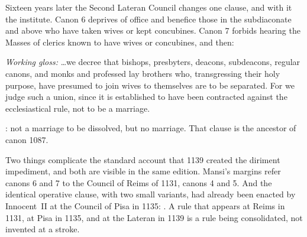 Sixteen years later the Second Lateran Council changes one clause, and with it the institute. Canon 6 deprives of office and benefice those in the subdiaconate and above who have taken wives or kept concubines. Canon 7 forbids hearing the Masses of clerics known to have wives or concubines, and then:

\begin{studyframe}

\emph{Working gloss:} \ldots we decree that bishops, presbyters, deacons, subdeacons, regular canons, and monks and professed lay brothers who, transgressing their holy purpose, have presumed to join wives to themselves are to be separated. For we judge such a union, since it is established to have been contracted against the ecclesiastical rule, not to be a marriage.
\end{studyframe}

: not a marriage to be dissolved, but no marriage. That clause is the ancestor of canon 1087.

Two things complicate the standard account that 1139 created the diriment impediment, and both are visible in the same edition. Mansi's margins refer canons 6 and 7 to the Council of Reims of 1131, canons 4 and 5. And the identical operative clause, with two small variants, had already been enacted by Innocent~II at the Council of Pisa in 1135: . A rule that appears at Reims in 1131, at Pisa in 1135, and at the Lateran in 1139 is a rule being consolidated, not invented at a stroke.

